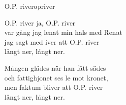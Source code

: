 \begin{song}{O.P. river}{opriver}
\begin{vers}
O.P. river ja, O.P. river\\
var gång jag lenat min hals med Renat\\
jag sagt med iver att O.P. river\\
långt ner, långt ner.\\
\end{vers}
\begin{vers}
Mången glädes när han fått sädes\\
och fattighjonet ses le mot kronet,\\
men faktum bliver att O.P. river\\
långt ner, långt ner.\\
\end{vers}
\end{song}

